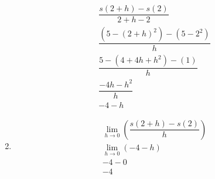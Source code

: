 \begin{enumerate}
\begin{gather*}
        \dfrac{s(2 + h) - s(2)}{2 + h - 2} \\
        \dfrac{\left(5 - \left(2 + h\right)^2\right) - \left(5 - 2^2\right)}{h} \\
        \dfrac{5 - \left(4 + 4h + h^2\right) - \left(1\right)}{h} \\
        \dfrac{-4h - h^2}{h} \\
        -4 - h
    \end{gather*}
    \item \begin{gather*}
        \lim_{h \to 0} \left(\dfrac{s(2 + h) - s(2)}{h}\right) \\
        \lim_{h \to 0} \left(-4 - h\right) \\
        -4 - 0 \\
        -4
    \end{gather*}
\end{enumerate}
